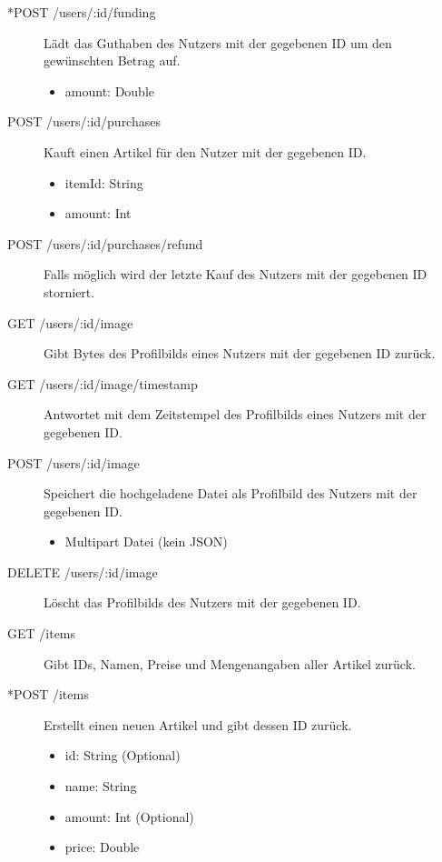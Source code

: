 \begin{description}
	\item[*POST /users/:id/funding] Lädt das Guthaben des Nutzers mit der gegebenen ID um den gewünschten Betrag auf.
	\begin{itemize}
		\item amount: Double
	\end{itemize}

	\item[POST /users/:id/purchases] Kauft einen Artikel für den Nutzer mit der gegebenen ID.
	\begin{itemize}
		\item itemId: String
		\item amount: Int
	\end{itemize}

	\item[POST /users/:id/purchases/refund] Falls möglich wird der letzte Kauf des Nutzers mit der gegebenen ID storniert.
	
	\item[GET /users/:id/image] Gibt Bytes des Profilbilds eines Nutzers mit der gegebenen ID zurück.
	
	\item[GET /users/:id/image/timestamp] Antwortet mit dem Zeitstempel des Profilbilds eines Nutzers mit der gegebenen ID.
	
	\item[POST /users/:id/image] Speichert die hochgeladene Datei als Profilbild des Nutzers mit der gegebenen ID.
	\begin{itemize}
		\item Multipart Datei (kein JSON)
	\end{itemize}

	\item[DELETE /users/:id/image] Löscht das Profilbilds des Nutzers mit der gegebenen ID.
	
	
	\item[GET /items] Gibt IDs, Namen, Preise und Mengenangaben aller Artikel zurück.

	\item[*POST /items] Erstellt einen neuen Artikel und gibt dessen ID zurück.
	\begin{itemize}
		\item id: String (Optional)
		\item name: String
		\item amount: Int (Optional)
		\item price: Double
	\end{itemize}
	

\end{description}
